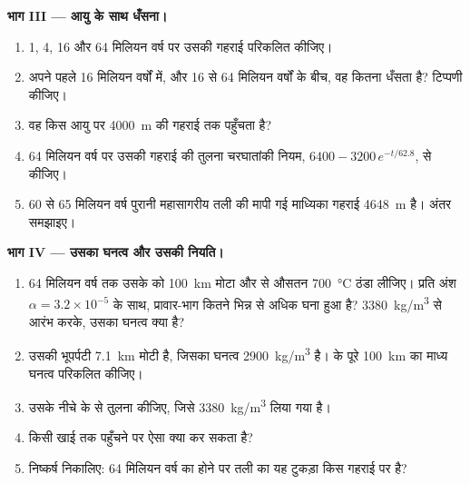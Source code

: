\begin{problem}
\medskip
\noindent\textbf{भाग III --- आयु के साथ धँसना।}
\begin{enumerate}[resume]
  \item 1, 4, 16 और 64 मिलियन वर्ष पर उसकी गहराई परिकलित कीजिए।
  \item अपने पहले 16 मिलियन वर्षों में, और 16 से 64 मिलियन वर्षों के बीच,
        वह कितना धँसता है? टिप्पणी कीजिए।
  \item वह किस आयु पर \qty{4000}{m} की गहराई तक पहुँचता है?
  \item 64 मिलियन वर्ष पर उसकी गहराई की तुलना चरघातांकी नियम,
        $6400 - 3200\,e^{-t/62.8}$, से कीजिए।
  \item 60 से 65 मिलियन वर्ष पुरानी महासागरीय तली की मापी गई माध्यिका गहराई
        \qty{4648}{m} है। अंतर समझाइए।
\end{enumerate}

\medskip
\noindent\textbf{भाग IV --- उसका घनत्व और उसकी नियति।}
\begin{enumerate}[resume]
  \item 64 मिलियन वर्ष तक उसके  को \qty{100}{km} मोटा और
         से औसतन \qty{700}{\celsius} ठंडा लीजिए।
        प्रति अंश $\alpha = 3.2 \times 10^{-5}$ के साथ,
        प्रावार-भाग कितने भिन्न से अधिक घना हुआ है? \qty{3380}{kg/m^3} से आरंभ करके,
        उसका घनत्व क्या है?
  \item उसकी भूपर्पटी \qty{7.1}{km} मोटी है, जिसका घनत्व
        \qty{2900}{kg/m^3} है।  के पूरे
        \qty{100}{km} का माध्य घनत्व परिकलित कीजिए।
  \item उसके नीचे के  से तुलना कीजिए, जिसे
        \qty{3380}{kg/m^3} लिया गया है।
  \item किसी खाई तक पहुँचने पर ऐसा  क्या कर सकता है?
  \item निष्कर्ष निकालिए: 64 मिलियन वर्ष का होने पर तली का यह टुकड़ा
        किस गहराई पर है?
\end{enumerate}
\end{problem}
